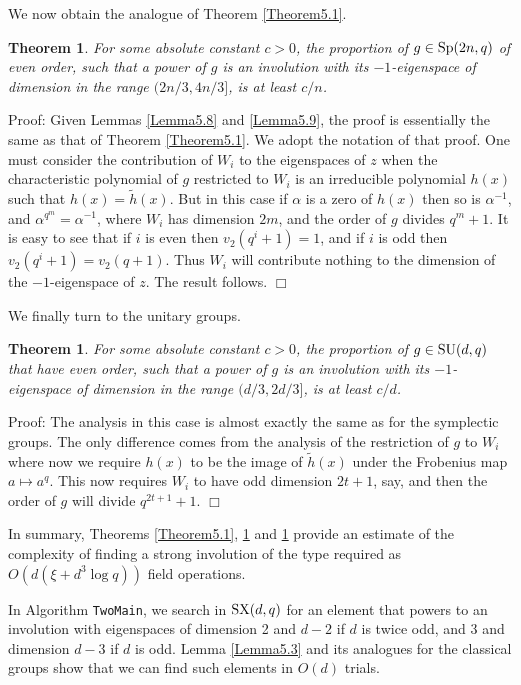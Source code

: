 \documentclass[12pt]{article}
\newtheorem{theorem}[definition]{Theorem}
\newenvironment{proof}{\normalsize {\sc Proof}:}{{\hfill $\Box$ \\}}
\def\Sp{{\rm Sp}}
\def\SU{{\rm SU}}
\def\SX{{\rm SX}}
\begin{document}
\noindent
We now obtain the analogue of Theorem \ref{Theorem5.1}.
\begin{theorem}\label{Theorem5.2}  
For some absolute constant $c>0$, the proportion
of $g \in \Sp(2n,q)$ of even order, such that a power of $g$
is an involution with its $-1$-eigenspace of dimension in the range
$(2n/3,4n/3]$, is at least $c/n$.
\end{theorem}
\begin{proof} 
Given Lemmas \ref{Lemma5.8} and \ref{Lemma5.9}, the proof is 
essentially the same as that of Theorem \ref{Theorem5.1}.   We
adopt the notation of that proof.  One
must consider the contribution of $W_i$ to the eigenspaces of $z$
when the characteristic polynomial of $g$ restricted to $W_i$ is
an irreducible polynomial $h(x)$ such that $h(x)=\tilde h(x)$.  But
in this case if $\alpha$ is a zero of $h(x)$ then so is $\alpha^{-1}$,
and $\alpha^{q^m}=\alpha^{-1}$, where $W_i$ has dimension $2m$, and the 
order of $g$
divides $q^m+1$.  It is easy to see that if $i$ is even then $v_2(q^i+1)=1$,
and if $i$ is odd then $v_2(q^i+1)=v_2(q+1)$.  Thus $W_i$ will
contribute nothing to the dimension of the $-1$-eigenspace of $z$.
The result follows.
\end{proof}

We finally turn to the unitary groups. 
\begin{theorem}\label{Theorem5.3}  For some absolute constant $c>0$, 
the proportion of $g\in \SU(d,q)$ that have even order, 
such that a power of $g$
is an involution with its $-1$-eigenspace of dimension in the range
$(d/3,2d/3]$, is at least $c/d $.
\end{theorem}
\begin{proof} 
The analysis in this case is almost
exactly the same as for the symplectic groups.  The only difference
comes from the analysis of the restriction of $g$ to $W_i$ where
now we require $h(x)$ to be the image of $\tilde h(x)$ under the Frobenius
map $a\mapsto a^q$.  This now requires $W_i$ to have odd dimension
$2t+1$, say, and then the order of $g$ will divide $q^{2t+1} +1$.
\end{proof}

In summary, Theorems \ref{Theorem5.1}, \ref{Theorem5.2} and \ref{Theorem5.3} 
provide an estimate of the
complexity of finding a strong involution of the type required 
as $O(d(\xi + d^3 \log q))$ field operations. 

In Algorithm {\tt TwoMain}, we search in $\SX(d, q)$
for an element that powers to an involution
with eigenspaces of dimension 2 and $d - 2$ if $d$ 
is twice odd, and $3$ and dimension $d - 3$ if $d$ is odd.
Lemma \ref{Lemma5.3} and its analogues for the classical
groups show that we can find such elements  in $O(d)$ trials. 
\end{document}
